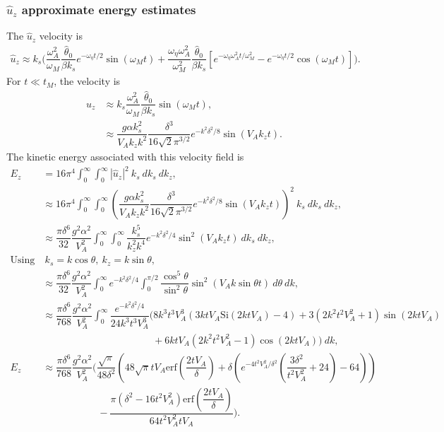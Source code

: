 \documentclass[12pt,psfig]{article}
\begin{document}
\subsubsection{$\hat{u}_z$ approximate energy estimates}
The $\hat{u}_z$ velocity is
\begin{align*}
\hat{u}_z\approx k_s\Biggl(\dfrac{\omega_A^2}{\omega_M}\dfrac{\hat{\theta}_0}{\beta k_s}e^{-\omega_\eta t/2}\sin(\omega_M t)+\dfrac{\omega_\eta\omega_A^2}{\omega_M^2}\dfrac{\hat{\theta}_0}{\beta k_s}\left[e^{-\omega_\eta\omega_A^2t/\omega_M^2}-e^{-\omega_\eta t/2}\cos(\omega_M t)\right]\Biggr).
\end{align*}
For $t\ll t_M$, the velocity is
\begin{align*}
\hat{u}_z&\approx k_s\dfrac{\omega_A^2}{\omega_M}\dfrac{\hat{\theta}_0}{\beta k_s} \sin(\omega_M t),\\
&\approx \dfrac{g\alpha k_s^2}{V_A k_zk^2}\dfrac{\delta^3}{16\sqrt{2}\pi^{3/2}}e^{-k^2\delta^2/8} \sin(V_A k_z t).
\end{align*}
The kinetic energy associated with this velocity field is
\begin{align*}
E_z&=16\pi^4\int_{0}^{\infty}\int_{0}^{\infty}|\hat{u}_z|^2 \ k_s \ dk_s \ dk_z,\\
&\approx 16\pi^4\int_{0}^{\infty}\int_{0}^{\infty}\left(\dfrac{g\alpha k_s^2}{V_A k_zk^2}\dfrac{\delta^3}{16\sqrt{2}\pi^{3/2}}e^{-k^2\delta^2/8} \sin(V_A k_z t)\right)^2 \ k_s \ dk_s \ dk_z,\\
&\approx \dfrac{\pi \delta^6}{32}\dfrac{g^2\alpha^2}{V_A^2}\int_{0}^{\infty}\int_{0}^{\infty}\dfrac{ k_s^5 }{ k_z^2k^4}e^{-k^2\delta^2/4} \sin^2(V_A k_z t)  \ dk_s \ dk_z,\\
\text{Using}& \ k_s=k\cos\theta, \ k_z=k\sin\theta, \\
&\approx \dfrac{\pi \delta^6}{32}\dfrac{g^2\alpha^2}{V_A^2}\int_{0}^{\infty}e^{-k^2\delta^2/4} \int_{0}^{\pi/2}\dfrac{\cos^5\theta}{\sin^2\theta}  \sin^2(V_A k \sin\theta t) \ d\theta  \ dk ,\\
&\approx \dfrac{\pi \delta^6}{768}\dfrac{g^2\alpha^2}{V_A^2}\int_{0}^{\infty}\dfrac{e^{-k^2\delta^2/4}}{24 k^3 t^3 V_A^3}  \Biggl(8 k^3 t^3 V_A^3 (3 k t V_A \text{Si}(2 k t V_A)-4)+3 \left(2 k^2 t^2 V_A^2+1\right) \sin (2 k t V_A)\\
&\mspace{200mu} +6 k t V_A \left(2 k^2 t^2 V_A^2-1\right) \cos (2 k t V_A)\Biggr)  \ dk ,\\
E_z&\approx \dfrac{\pi \delta^6}{768}\dfrac{g^2\alpha^2}{V_A^2} \Biggl(\dfrac{\sqrt{\pi }}{48 \delta^2}\left(48 \sqrt{\pi } t V_A \text{erf}\left(\dfrac{2 t  V_A }{\delta}\right)+\delta \left(e^{-4 t^2 V_A^2/\delta^2} \left(\dfrac{3 \delta^2}{t^2 V_A^2}+24\right)-64\right)\right)\\
&\mspace{100mu} -\dfrac{\pi  \left(\delta^2-16 t^2 V_A^2\right) \text{erf}\left(\dfrac{2 t  V_A }{\delta}\right)}{64 t^2 V_A^2 t  V_A }\Biggr).
\end{align*}
\end{document}
